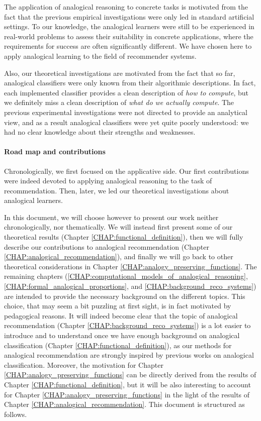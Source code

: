 The application of analogical reasoning to concrete tasks is motivated from the
fact that the previous empirical investigations were only led in standard
artificial settings. To our knowledge, the analogical learners were still to be
experienced in real-world problems to assess their suitability in concrete
applications, where the requirements for success are often significantly
different. We have chosen here to apply analogical learning to the field of
recommender systems.

Also, our theoretical investigations are motivated from the fact that so far,
analogical classifiers were only known from their algorithmic descriptions.  In
fact, each implemented classifier provides a clean description of {\it how to
compute}, but we definitely miss a clean description of {\it what do we
actually compute}. The previous experimental investigations were not directed
to provide an analytical view, and as a result analogical classifiers were yet
quite poorly understood: we had no clear knowledge about their strengths and
weaknesses.

\paragraph{Road map and contributions\\}

Chronologically, we first focused on the applicative side. Our first
contributions were indeed devoted to applying analogical reasoning to the task
of recommendation. Then, later, we led our theoretical investigations about
analogical learners.

In this document, we will choose however to present our work neither
chronologically, nor thematically. We will instead first present some of our
theoretical results (Chapter \ref{CHAP:functional_definition}), then we will
fully describe our contributions to analogical recommendation (Chapter
\ref{CHAP:analogical_recommendation}), and finally we will go back to other
theoretical considerations in Chapter \ref{CHAP:analogy_preserving_functions}.
The remaining chapters
(\ref{CHAP:computational_models_of_analogical_reasoning},
\ref{CHAP:formal_analogical_proportions}, and
\ref{CHAP:background_reco_systems}) are intended to provide the necessary
background on the different topics. This choice, that may seem a bit puzzling
at first sight, is in fact motivated by pedagogical reasons. It will indeed
become clear that the topic of analogical recommendation (Chapter
\ref{CHAP:background_reco_systems}) is a lot easier to
introduce and to understand once we have enough background on analogical
classification (Chapter \ref{CHAP:functional_definition}), as our methods for
analogical recommendation are strongly inspired by previous works on analogical
classification. Moreover, the motivation for Chapter
\ref{CHAP:analogy_preserving_functions} can be directly derived from the
results of Chapter \ref{CHAP:functional_definition}, but it will be also
interesting to account for Chapter \ref{CHAP:analogy_preserving_functions} in
the light of the results of Chapter \ref{CHAP:analogical_recommendation}.  This
document is structured as follows.\\

